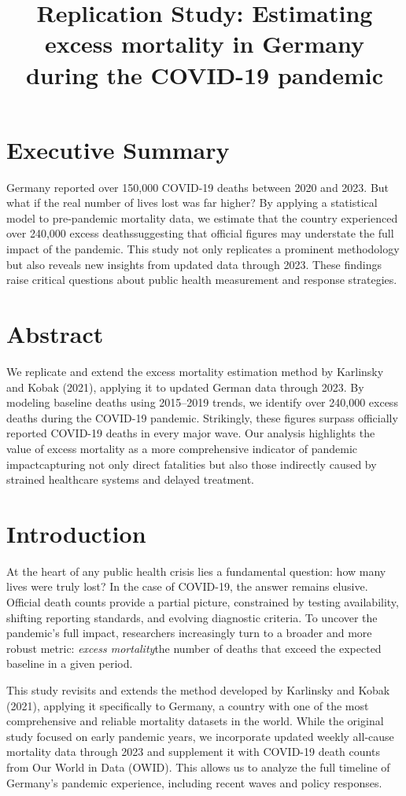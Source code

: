 \documentclass[a4paper,11pt]{article}
\title{Replication Study: Estimating excess mortality in Germany during the COVID-19 pandemic}
\author{}
\date{}
\begin{document}
\maketitle

\section*{Executive Summary}
Germany reported over 150,000 COVID-19 deaths between 2020 and 2023. But what if the real number of lives lost was far higher? By applying a statistical model to pre-pandemic mortality data, we estimate that the country experienced over 240,000 excess deaths\textemdash suggesting that official figures may understate the full impact of the pandemic. This study not only replicates a prominent methodology but also reveals new insights from updated data through 2023. These findings raise critical questions about public health measurement and response strategies.

\section*{Abstract}
We replicate and extend the excess mortality estimation method by Karlinsky and Kobak (2021)\citep{karlinsky2021excess}, applying it to updated German data through 2023. By modeling baseline deaths using 2015–2019 trends, we identify over 240,000 excess deaths during the COVID-19 pandemic. Strikingly, these figures surpass officially reported COVID-19 deaths in every major wave. Our analysis highlights the value of excess mortality as a more comprehensive indicator of pandemic impact\textemdash capturing not only direct fatalities but also those indirectly caused by strained healthcare systems and delayed treatment.

\section{Introduction}
At the heart of any public health crisis lies a fundamental question: how many lives were truly lost? In the case of COVID-19, the answer remains elusive. Official death counts provide a partial picture, constrained by testing availability, shifting reporting standards, and evolving diagnostic criteria. To uncover the pandemic's full impact, researchers increasingly turn to a broader and more robust metric: \emph{excess mortality}\textemdash the number of deaths that exceed the expected baseline in a given period.

This study revisits and extends the method developed by Karlinsky and Kobak (2021)\citep{karlinsky2021excess}, applying it specifically to Germany, a country with one of the most comprehensive and reliable mortality datasets in the world. While the original study focused on early pandemic years, we incorporate updated weekly all-cause mortality data through 2023 and supplement it with COVID-19 death counts from Our World in Data (OWID). This allows us to analyze the full timeline of Germany’s pandemic experience, including recent waves and policy responses.
\end{document}
